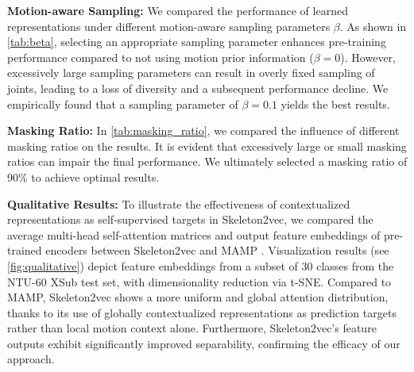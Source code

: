 \noindent \textbf{Motion-aware Sampling:}
We compared the performance of learned representations under different motion-aware
sampling parameters $\beta$. As shown in \cref{tab:beta}, selecting an appropriate
sampling parameter enhances pre-training performance compared to not using
motion prior information ($\beta=0$). However, excessively large sampling parameters
can result in overly fixed sampling of joints, leading to a loss of diversity and
a subsequent performance decline. We empirically found that a sampling parameter of
$\beta=0.1$ yields the best results.

\noindent \textbf{Masking Ratio:}
In \cref{tab:masking_ratio}, we compared the influence of different masking ratios
on the results. It is evident that excessively large or small masking ratios can
impair the final performance. We ultimately selected a masking ratio of 90\% to
achieve optimal results.

\noindent \textbf{Qualitative Results:}
To illustrate the effectiveness of contextualized representations as self-supervised targets
in Skeleton2vec, we compared the average multi-head self-attention matrices and
output feature embeddings of pre-trained encoders between Skeleton2vec and MAMP \cite{mao2023masked}.
Visualization results (see \cref{fig:qualitative}) depict feature embeddings from a subset
of 30 classes from the NTU-60 XSub test set, with dimensionality reduction via t-SNE.
Compared to MAMP, Skeleton2vec shows a more uniform and global attention distribution,
thanks to its use of globally contextualized representations as prediction targets
rather than local motion context alone. Furthermore, Skeleton2vec's feature outputs exhibit
significantly improved separability, confirming the efficacy of our approach.